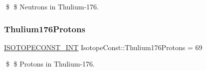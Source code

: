 \$ \$ Neutrons in Thulium-\/176. \mbox{\label{group___isotope_const-_thulium-_tm176_gaa7913fafe739b898368707e7558629c7}} 
\subsubsection{\texorpdfstring{Thulium176\+Protons}{Thulium176Protons}}
{\footnotesize\ttfamily \mbox{\hyperlink{group___isotope_const-_macros_ga5f18360b3e99483a35c32d789e62621c}{I\+S\+O\+T\+O\+P\+E\+C\+O\+N\+S\+T\+\_\+\+I\+NT}} Isotope\+Const\+::\+Thulium176\+Protons = 69}

\$ \$ Protons in Thulium-\/176. 